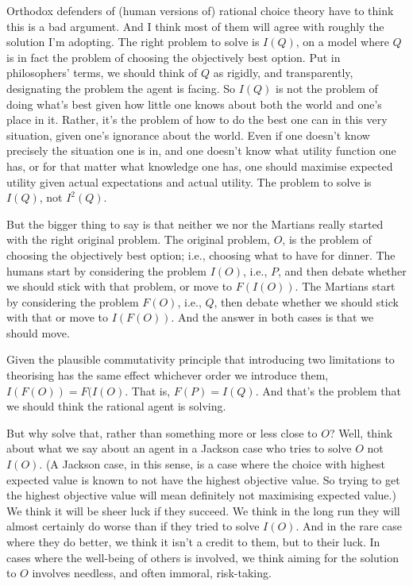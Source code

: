 \documentclass[
  12pt,
]{article}
\begin{document}
Orthodox defenders of (human versions of) rational choice theory have to think this is a bad argument. And I think most of them will agree with roughly the solution I'm adopting. The right problem to solve is \(I(Q)\), on a model where \(Q\) is in fact the problem of choosing the objectively best option. Put in philosophers' terms, we should think of \(Q\) as rigidly, and transparently, designating the problem the agent is facing. So \(I(Q)\) is not the problem of doing what's best given how little one knows about both the world and one's place in it. Rather, it's the problem of how to do the best one can in this very situation, given one's ignorance about the world. Even if one doesn't know precisely the situation one is in, and one doesn't know what utility function one has, or for that matter what knowledge one has, one should maximise expected utility given actual expectations and actual utility. The problem to solve is \(I(Q)\), not \(I^2(Q)\).

But the bigger thing to say is that neither we nor the Martians really started with the right original problem. The original problem, \(O\), is the problem of choosing the objectively best option; i.e., choosing what to have for dinner. The humans start by considering the problem \(I(O)\), i.e., \(P\), and then debate whether we should stick with that problem, or move to \(F(I(O))\). The Martians start by considering the problem \(F(O)\), i.e., \(Q\), then debate whether we should stick with that or move to \(I(F(O))\). And the answer in both cases is that we should move.

Given the plausible commutativity principle that introducing two limitations to theorising has the same effect whichever order we introduce them, \(I(F(O)) = F(I(O)\). That is, \(F(P) = I(Q)\). And that's the problem that we should think the rational agent is solving.

But why solve that, rather than something more or less close to \(O\)? Well, think about what we say about an agent in a Jackson case who tries to solve \(O\) not \(I(O)\). (A Jackson case, in this sense, is a case where the choice with highest expected value is known to not have the highest objective value. So trying to get the highest objective value will mean definitely not maximising expected value.) We think it will be sheer luck if they succeed. We think in the long run they will almost certainly do worse than if they tried to solve \(I(O)\). And in the rare case where they do better, we think it isn't a credit to them, but to their luck. In cases where the well-being of others is involved, we think aiming for the solution to \(O\) involves needless, and often immoral, risk-taking.
\end{document}
